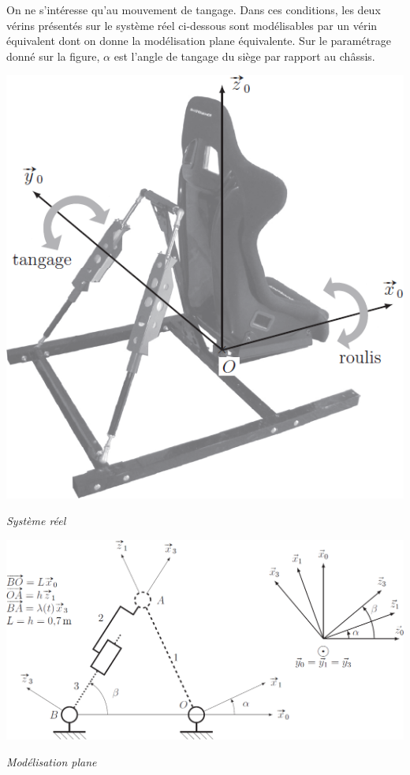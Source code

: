\documentclass[10pt]{article}
\begin{document}
On ne s'intéresse qu'au mouvement de tangage. Dans ces conditions, les deux vérins présentés sur le système réel ci-dessous sont modélisables par un vérin équivalent dont on donne la modélisation plane équivalente. Sur le paramétrage donné sur la figure,  $\alpha$ est l’angle de tangage du siège par rapport au châssis.

\begin{minipage}[c]{.33\linewidth}
\begin{center}
\includegraphics[width=\textwidth]{images/Simulateur2}

\textit{Système réel}
\end{center}
\end{minipage} \hfill
\begin{minipage}[c]{.63\linewidth}
\begin{center}
\includegraphics[width=\textwidth]{images/Simulateur3}

\textit{Modélisation plane}
\end{center}
\end{minipage}
\end{document}
